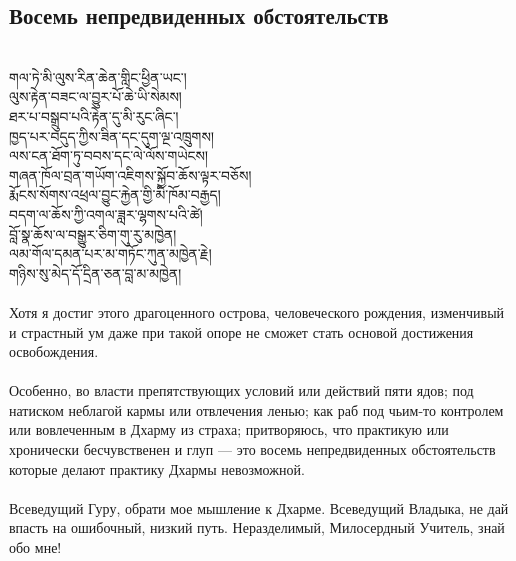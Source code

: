 \subsection*{Восемь непредвиденных обстоятельств}
\\
\ti
གལ་ཏེ་མི་ལུས་རིན་ཆེན་གླིང་ཕྱིན་ཡང༌།\\
ལུས་རྟེན་བཟང་ལ་བྱུར་པོ་ཆེ་ཡི་སེམས། \\
ཐར་པ་བསྒྲུབ་པའི་རྟེན་དུ་མི་རུང་ཞིང༌། \\
ཁྱད་པར་བདུད་ཀྱིས་ཟིན་དང་དུག་ལྔ་འཁྲུགས། \\
ལས་ངན་ཐོག་ཏུ་བབས་དང་ལེ་ལོས་གཡེངས། \\
གཞན་ཁོལ་བྲན་གཡོག་འཇིགས་སྐྱོབ་ཆོས་ལྟར་བཅོས། \\
རྨོངས་སོགས་འཕྲལ་བྱུང་རྐྱེན་གྱི་མི་ཁོམ་བརྒྱད། \\
བདག་ལ་ཆོས་ཀྱི་འགལ་ཟླར་ལྷགས་པའི་ཚེ། \\
བློ་སྣ་ཆོས་ལ་བསྒྱུར་ཅིག་གུ་རུ་མཁྱེན། \\
ལམ་གོལ་དམན་པར་མ་གཏོང་ཀུན་མཁྱེན་རྗེ། \\
གཉིས་སུ་མེད་དོ་དྲིན་ཅན་བླ་མ་མཁྱེན། \\
\\
\ru
\noindent
Хотя я достиг этого драгоценного острова, человеческого рождения,
изменчивый и страстный ум даже при такой опоре
не сможет стать основой достижения освобождения.\\
\\
Особенно, во власти препятствующих условий или действий пяти ядов;
под натиском неблагой кармы или отвлечения ленью;
как раб под чьим-то контролем или вовлеченным в Дхарму из страха;
притворяюсь, что практикую или хронически бесчув\-ственен и глуп
— это восемь непредвиденных обстоя\-тельств которые
делают практику Дхармы невозможной.\\
\\
Всеведущий Гуру, обрати мое мышление к Дхарме.
Всеведущий Владыка, не дай впасть на ошибочный, низкий путь.
Нераздели\-мый, Милосердный Учитель, знай обо мне!

\newpage
